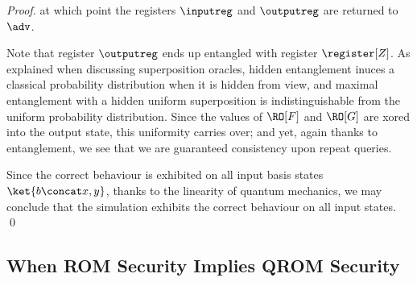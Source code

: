\begin{proof}
      \noindent
      at which point the registers $\inputreg$ and $\outputreg$ are returned to $\adv$.  

      Note that register $\outputreg$ ends up entangled with register $\register[Z]$. As
        explained when discussing superposition oracles, hidden entanglement
        inuces a classical probability distribution when it is hidden from view, and
        maximal entanglement with a hidden uniform superposition is
        indistinguishable from the uniform probability distribution. Since the values of
        $\RO[F]$ and $\RO[G]$ are xored into the output state, this uniformity
        carries over; and yet, again thanks to entanglement, we see that we are
        guaranteed consistency upon repeat queries. 

      Since the correct behaviour is exhibited on all input basis states
        $\ket{b \concat x, y}$, thanks to the linearity of quantum mechanics,
        we may conclude that the simulation exhibits the correct behaviour on
        all input states.
      \qed
    \end{proof}

  \subsection{When ROM Security Implies QROM Security}
    
